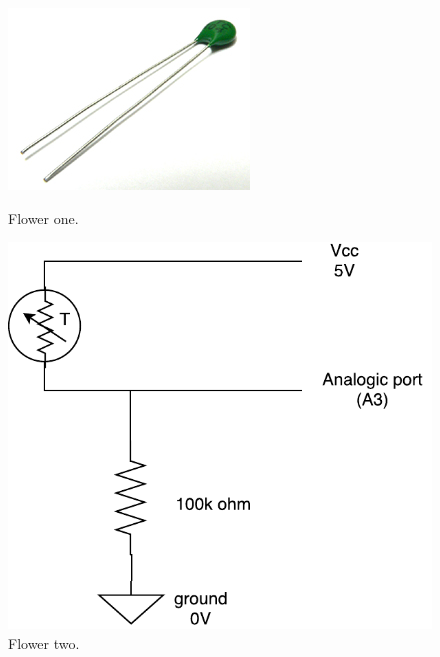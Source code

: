 \begin{figure}[h]
	\centering
	\begin{minipage}[b]{0.4\textwidth}
		\includegraphics[width=\textwidth]{img/hardware/temperatura.jpg}
		\caption{Flower one.}
	\end{minipage}
	\hfill
	\begin{minipage}[b]{0.4\textwidth}
		\includegraphics[width=\textwidth]{img/hardware/temp-esquema.pdf}
		\caption{Flower two.}
	\end{minipage}
\end{figure}



